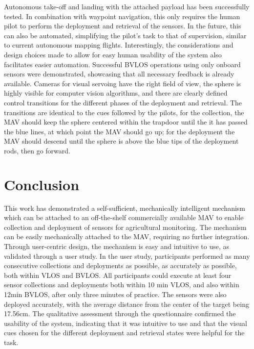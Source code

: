 Autonomous take-off and landing with the attached payload has been successfully tested. In combination with waypoint navigation, this only requires the human pilot to perform the deployment and retrieval of the sensors. In the future, this can also be automated, simplifying the pilot's task to that of supervision, similar to current autonomous mapping flights. Interestingly, the considerations and design choices made to allow for easy human usability of the system also facilitates easier automation. Successful \gls{BVLOS} operations using only onboard sensors were demonstrated, showcasing that all necessary feedback is already available. Cameras for visual servoing have the right field of view, the sphere is highly visible for computer vision algorithms, and there are clearly defined control transitions for the different phases of the deployment and retrieval. The transitions are identical to the cues followed by the pilots, for the collection, the \gls{MAV} should keep the sphere centered within the trapdoor until the it has passed the blue lines, at which point the \gls{MAV} should go up; for the deployment the \gls{MAV} should descend until the sphere is above the blue tips of the deployment rods, then go forward. 

\section{Conclusion}

This work has demonstrated a self-sufficient, mechanically intelligent mechanism which can be attached to an off-the-shelf commercially available \gls{MAV} to enable collection and deployment of sensors for agricultural monitoring. The mechanism can be easily mechanically attached to the \gls{MAV}, requiring no further integration. Through user-centric design, the mechanism is easy and intuitive to use, as validated through a user study. In the user study, participants performed as many consecutive collections and deployments as possible, as accurately as possible, both within \gls{VLOS} and \gls{BVLOS}. All participants could execute at least four sensor collections and deployments both within 10 min \gls{VLOS}, and  also within 12min \gls{BVLOS}, after only three minutes of practice. The sensors were also deployed accurately, with the average distance from the center of the target being 17.56cm. The qualitative assessment through the questionnaire confirmed the usability of the system,  indicating that it was intuitive to use and that the visual cues chosen for the different deployment and retrieval states were helpful for the task.


